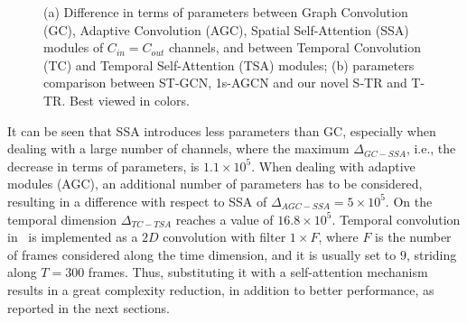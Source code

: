 \documentclass[times,twocolumn,final,authoryear]{elsarticle}
\begin{document}
\begin{figure}[t]
\begin{minipage}{.45\linewidth}
{{}
  \label{fig:nets_params}
  }
\end{minipage}
\begin{minipage}[t]{.05\linewidth}\end{minipage}
\caption{(a) Difference in terms of parameters between Graph Convolution (GC), Adaptive Convolution (AGC), Spatial Self-Attention (SSA) modules of $C_{in}=C_{out}$ channels, and between Temporal Convolution (TC) and Temporal Self-Attention (TSA) modules; (b) parameters comparison between ST-GCN, 1s-AGCN and our novel S-TR and T-TR. Best viewed in colors.}
\label{fig:ssa_tsa_params}
\end{figure}
It can be seen that SSA introduces less parameters than GC, especially when dealing with a large number of channels, where the maximum $\Delta_{GC-SSA}$, i.e., the decrease in terms of parameters, is $1.1 \times 10^5$. When dealing with adaptive modules (AGC), an additional number of parameters has to be considered, resulting in a difference with respect to SSA of $\Delta_{AGC-SSA}=5\times 10^5$. 
On the temporal dimension $\Delta_{TC-TSA}$ reaches a value of $16.8 \times 10^5$. Temporal convolution in~\cite{yan2018spatial} is implemented as a $2D$ convolution with filter $1 \times F$, where $F$ is the number of frames considered along the time dimension, and it is usually set to $9$, striding along $T=300$ frames. Thus, substituting it with a self-attention mechanism results in a great complexity reduction, in addition to better performance, as reported in the next sections. 
\end{document}
